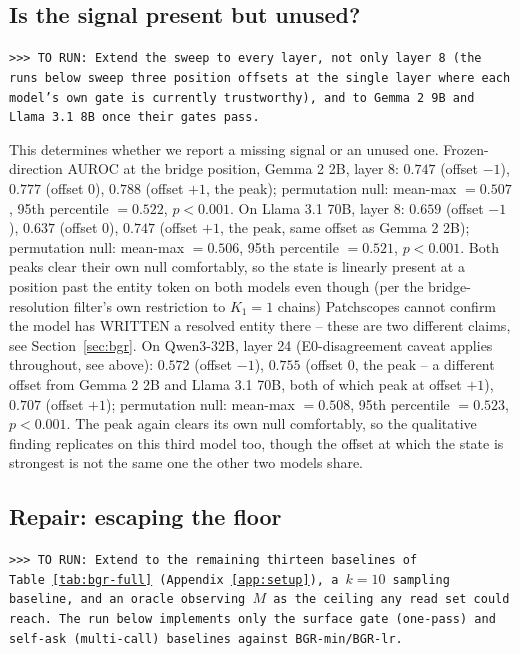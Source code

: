 \documentclass{article}
\newcommand{\TORUN}[1]{{\color{blue}\texttt{>{}>{}> TO RUN: #1}}}
\begin{document}
\subsection{Is the signal present but unused?}
\label{sec:res-latent}

\TORUN{Extend the sweep to every layer, not only layer 8 (the runs below sweep three position
offsets at the single layer where each model's own gate is currently trustworthy), and to Gemma 2 9B
and Llama 3.1 8B once their gates pass.}

This determines whether we report a missing signal or an unused one. Frozen-direction AUROC at the
bridge position, Gemma 2 2B, layer 8: $0.747$ (offset $-1$), $0.777$ (offset $0$), $0.788$ (offset
$+1$, the peak); permutation null: mean-max $=0.507$, 95th percentile $=0.522$, $p<0.001$. On Llama 3.1
70B, layer 8: $0.659$ (offset $-1$), $0.637$ (offset $0$), $0.747$ (offset $+1$, the peak, same
offset as Gemma 2 2B); permutation null: mean-max $=0.506$, 95th percentile $=0.521$, $p<0.001$. Both
peaks clear their own null comfortably, so the state is linearly present at a position past the entity
token on both models even though (per
the bridge-resolution filter's own restriction to $K_1{=}1$ chains) Patchscopes cannot confirm the
model has WRITTEN a resolved entity there -- these are two different claims, see
Section~\ref{sec:bgr}. On Qwen3-32B, layer 24 (E0-disagreement caveat applies throughout, see above):
$0.572$ (offset $-1$), $0.755$ (offset $0$, the peak -- a different offset from Gemma 2 2B and Llama
3.1 70B, both of which peak at offset $+1$), $0.707$ (offset $+1$); permutation null: mean-max
$=0.508$, 95th percentile $=0.523$, $p<0.001$. The peak again clears its own null comfortably, so the
qualitative finding replicates on this third model too, though the offset at which the state is
strongest is not the same one the other two models share.

\subsection{Repair: escaping the floor}

\TORUN{Extend to the remaining thirteen baselines of Table~\ref{tab:bgr-full}
(Appendix~\ref{app:setup}), a $k{=}10$ sampling baseline, and an oracle observing $M$ as the ceiling
any read set could reach. The run below implements only the surface gate (one-pass) and self-ask
(multi-call) baselines against BGR-min/BGR-lr.}
\end{document}
